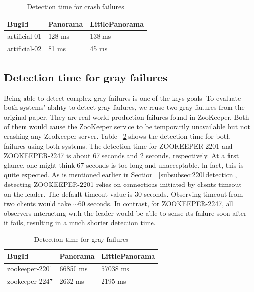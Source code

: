 \begin{table}[!tb]
\begin{tabular}{p{}p{}p{}}%

\toprule
\textbf{BugId} & \textbf{Panorama} & \textbf{LittlePanorama} \\
\midrule
  artificial-01    &    128 ms  &  138 ms  \\
  artificial-02       &   81 ms   &  45 ms \\
\bottomrule
\end{tabular}
\vspace{0.5em}
\caption{Detection time for crash failures}
\label{tab:crashperf}
\end{table}

\subsection{Detection time for gray failures}
Being able to detect complex gray failures is one of the keys goals. To evaluate both systems' ability to detect gray failures, we reuse two gray failures from the original paper. They are real-world production failures found in ZooKeeper. Both of them would cause the ZooKeeper service to be temporarily unavailable but not crashing any ZooKeeper server. Table ~\ref{tab:grayperf} shows the detection time for both failures using both systems. The detection time for ZOOKEEPER-2201 and ZOOKEEPER-2247 is about 67 seconds and 2 seconds, respectively. At a first glance, one might think 67 seconds is  too long and unacceptable. In fact, this is quite expected. As is mentioned earlier in Section ~\ref{subsubsec:2201detection}, detecting ZOOKEEPER-2201 relies on connections initiated by clients timeout on the leader. The default timeout value is 30 seconds. Observing timeout from two clients would take $\sim$60 seconds. In contrast, for ZOOKEEPER-2247, all observers interacting with the leader would be able to sense its failure soon after it fails, resulting in a much shorter detection time.
 
\begin{table}[!tb]
\begin{tabular}{p{}p{}p{}}%

\toprule
\textbf{BugId} & \textbf{Panorama} & \textbf{LittlePanorama} \\
\midrule
  zookeeper-2201    &   66850 ms   &  67038 ms \\
  zookeeper-2247    &   2632 ms    &  2195 ms  \\
\bottomrule
\end{tabular}
\vspace{0.5em}
\caption{Detection time for gray failures}
\label{tab:grayperf}
\end{table}

